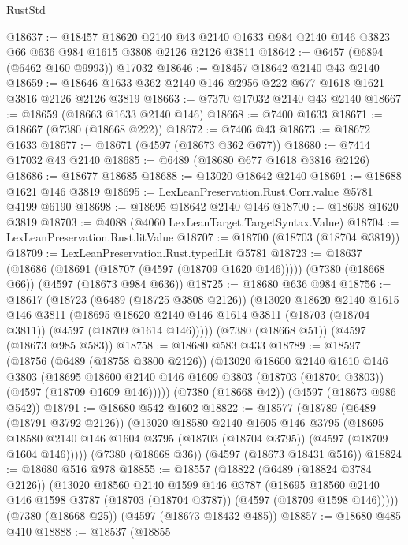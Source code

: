 \begin{lexlean}{RustStd}
\begin{coremodule}
@18637 := @18457
    @18620
    @2140
    @43
    @2140
    @1633
    @984
    @2140
    @146
    @3823
    @66
    @636
    @984
    @1615
    @3808
    @2126
    @2126
    @3811
@18642 := @6457 (@6894 (@6462 @160 @9993)) @17032
@18646 := @18457 @18642 @2140 @43 @2140
@18659 := @18646 @1633 @362 @2140 @146 @2956 @222 @677 @1618 @1621 @3816 @2126 @2126 @3819
@18663 := @7370 @17032 @2140 @43 @2140
@18667 := @18659 (@18663 @1633 @2140 @146)
@18668 := @7400 @1633
@18671 := @18667 (@7380 (@18668 @222))
@18672 := @7406 @43
@18673 := @18672 @1633
@18677 := @18671 (@4597 (@18673 @362 @677))
@18680 := @7414 @17032 @43 @2140
@18685 := @6489 (@18680 @677 @1618 @3816 @2126)
@18686 := @18677 @18685
@18688 := @13020 @18642 @2140
@18691 := @18688 @1621 @146 @3819
@18695 := LexLeanPreservation.Rust.Corr.value @5781 @4199 @6190
@18698 := @18695 @18642 @2140 @146
@18700 := @18698 @1620 @3819
@18703 := @4088 (@4060 LexLeanTarget.TargetSyntax.Value)
@18704 := LexLeanPreservation.Rust.litValue
@18707 := @18700 (@18703 (@18704 @3819))
@18709 := LexLeanPreservation.Rust.typedLit @5781
@18723 := @18637
    (@18686 (@18691 (@18707 (@4597 (@18709 @1620 @146)))))
    (@7380 (@18668 @66))
    (@4597 (@18673 @984 @636))
@18725 := @18680 @636 @984
@18756 := @18617
    (@18723
      (@6489 (@18725 @3808 @2126))
      (@13020
        @18620
        @2140
        @1615
        @146
        @3811
        (@18695 @18620 @2140 @146 @1614 @3811 (@18703 (@18704 @3811)) (@4597 (@18709 @1614 @146)))))
    (@7380 (@18668 @51))
    (@4597 (@18673 @985 @583))
@18758 := @18680 @583 @433
@18789 := @18597
    (@18756
      (@6489 (@18758 @3800 @2126))
      (@13020
        @18600
        @2140
        @1610
        @146
        @3803
        (@18695 @18600 @2140 @146 @1609 @3803 (@18703 (@18704 @3803)) (@4597 (@18709 @1609 @146)))))
    (@7380 (@18668 @42))
    (@4597 (@18673 @986 @542))
@18791 := @18680 @542 @1602
@18822 := @18577
    (@18789
      (@6489 (@18791 @3792 @2126))
      (@13020
        @18580
        @2140
        @1605
        @146
        @3795
        (@18695 @18580 @2140 @146 @1604 @3795 (@18703 (@18704 @3795)) (@4597 (@18709 @1604 @146)))))
    (@7380 (@18668 @36))
    (@4597 (@18673 @18431 @516))
@18824 := @18680 @516 @978
@18855 := @18557
    (@18822
      (@6489 (@18824 @3784 @2126))
      (@13020
        @18560
        @2140
        @1599
        @146
        @3787
        (@18695 @18560 @2140 @146 @1598 @3787 (@18703 (@18704 @3787)) (@4597 (@18709 @1598 @146)))))
    (@7380 (@18668 @25))
    (@4597 (@18673 @18432 @485))
@18857 := @18680 @485 @410
@18888 := @18537
    (@18855

\end{coremodule}
\end{lexlean}
